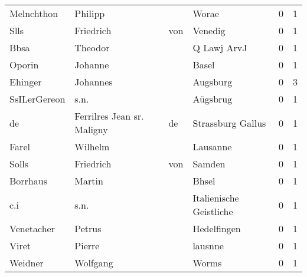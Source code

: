\begin{tabular}{llllrr}
               Melnchthon &                            Philipp &             &                                       Worae &          0 &         1 \\
                     Slls &                          Friedrich &         von &                                     Venedig &          0 &         1 \\
                     Bbsa &                            Theodor &             &                                 Q Lawj ArvJ &          0 &         1 \\
                   Oporin &                            Johanne &             &                                       Basel &          0 &         1 \\
                  Ehinger &                           Johannes &             &                                    Augsburg &          0 &         3 \\
             SsILerGereon &                               s.n. &             &                                    Aügsbrug &          0 &         1 \\
                       de &         Ferrilres Jean sr. Maligny &          de &                           Strassburg Gallus &          0 &         1 \\
                    Farel &                            Wilhelm &             &                                    Lausanne &          0 &         1 \\
                    Solls &                          Friedrich &         von &                                      Samden &          0 &         1 \\
                 Borrhaus &                             Martin &             &                                       Bhsel &          0 &         1 \\
                      c.i &                               s.n. &             &                     Italienische Geistliche &          0 &         1 \\
               Venetacher &                             Petrus &             &                                 Hedelfingen &          0 &         1 \\
                    Viret &                             Pierre &             &                                     lausnne &          0 &         1 \\
                  Weidner &                           Wolfgang &             &                                       Worms &          0 &         1 \\

\end{tabular}
